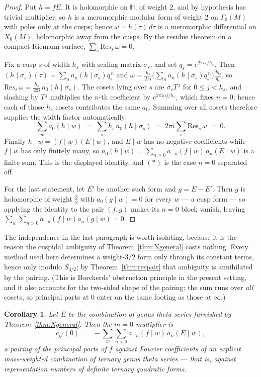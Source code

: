 \documentclass[11pt,reqno]{amsart}
\theoremstyle{plain}
\newtheorem{corollary}[theorem]{Corollary}
\theoremstyle{definition}
\newcommand{\HH}{\mathbb{H}}
\begin{document}
\begin{proof}
Put $h=fE$. It is holomorphic on $\HH$, of weight $2$, and by hypothesis has trivial
multiplier, so $h$ is a meromorphic modular form of weight $2$ on $\Gamma_0(M)$ with
poles only at the cusps; hence $\omega=h(\tau)\,d\tau$ is a meromorphic differential on
$X_0(M)$, holomorphic away from the cusps. By the residue theorem on a compact Riemann
surface, $\sum_s\mathrm{Res}_s\,\omega=0$.

Fix a cusp $s$ of width $h_s$ with scaling matrix $\sigma_s$, and set
$q_s=e^{2\pi i\tau/h_s}$. Then $(h\mid\sigma_s)(\tau)=\sum_n a_n(h\mid\sigma_s)q_s^{\,n}$
and $\omega=\frac{h_s}{2\pi i}\bigl(\sum_n a_n(h\mid\sigma_s)q_s^{\,n}\bigr)\frac{dq_s}{q_s}$,
so $\mathrm{Res}_s\,\omega=\frac{h_s}{2\pi i}\,a_0(h\mid\sigma_s)$. The cosets lying over
$s$ are $\sigma_sT^{\,j}$ for $0\le j<h_s$, and slashing by $T^{\,j}$ multiplies the
$n$-th coefficient by $e^{2\pi i n j/h_s}$, which fixes $n=0$; hence each of those $h_s$
cosets contributes the same $a_0$. Summing over all cosets therefore supplies the width
factor automatically:
\[
  \sum_{w} a_0(h\mid w)\;=\;\sum_s h_s\,a_0(h\mid\sigma_s)
  \;=\;2\pi i\sum_s \mathrm{Res}_s\,\omega\;=\;0 .
\]
Finally $h\mid w=(f\mid w)(E\mid w)$, and $E\mid w$ has no negative coefficients while
$f\mid w$ has only finitely many, so
$a_0(h\mid w)=\sum_{n\ge0}a_{-n}(f\mid w)\,a_n(E\mid w)$ is a finite sum. This is the
displayed identity, and $(\ast)$ is the case $n=0$ separated off.

For the last statement, let $E'$ be another such form and $g=E-E'$. Then $g$ is
holomorphic of weight $\tfrac32$ with $a_0(g\mid w)=0$ for every $w$ --- a cusp form ---
so applying the identity to the pair $(f,g)$ makes its $n=0$ block vanish, leaving
$\sum_w\sum_{n>0}a_{-n}(f\mid w)a_n(g\mid w)=0$.
\end{proof}

The independence in the last paragraph is worth isolating, because it is the reason the
cuspidal ambiguity of Theorem~\ref{thm:Ngeneral} costs nothing. Every method used here
determines a weight-$3/2$ form only through its constant terms, hence only modulo
$S_{3/2}$; by Theorem~\ref{thm:respair} that ambiguity is annihilated by the pairing.
(This is Borcherds' obstruction principle in the present setting, and it also accounts for
the two-sided shape of the pairing: the sum runs over \emph{all} cosets, so principal
parts at $0$ enter on the same footing as those at $\infty$.)

\begin{corollary}\label{cor:multgross}
Let $E$ be the combination of genus theta series furnished by Theorem~\ref{thm:Ngeneral}.
Then the $m=0$ multiplier is
\[
  c_{\eta^*}(0)\;=\;-\sum_w\sum_{n>0}a_{-n}(f\mid w)\,a_n(E\mid w),
\]
a pairing of the principal parts of $f$ against Fourier coefficients of an explicit
mass-weighted combination of ternary genus theta series --- that is, against
representation numbers of definite ternary quadratic forms.
\end{corollary}
\end{document}
